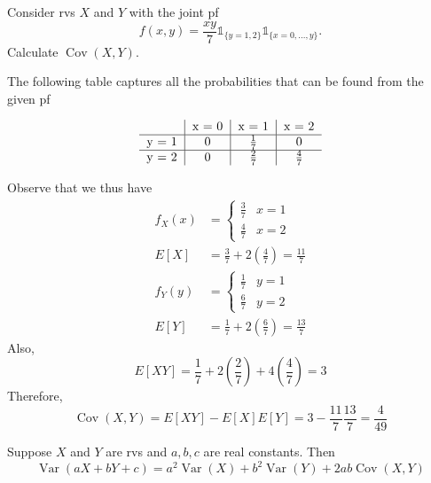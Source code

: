\documentclass[notoc,notitlepage]{tufte-book}
\DeclareMathOperator{\Var}{Var }
\DeclareMathOperator{\Cov}{Cov }
\begin{document}
\begin{eg}[Example 3.18]
  Consider rvs $X$ and $Y$ with the joint pf
  \begin{equation*}
    f(x, y) = \frac{xy}{7} \mathbb{1}_{\{y = 1, 2\}} \mathbb{1}_{\{x = 0, ..., y\}}.
  \end{equation*}
  Calculate $\Cov(X, Y)$.

  \begin{solution}
    The following table captures all the probabilities that can be found from the given pf

    \[
    \begin{tabular}{c | c | c | c}
            & x = 0 & x = 1       & x = 2 \\
      \hline
      y = 1 & 0     & $\frac{1}{7}$ & 0 \\
      \hline
      y = 2 & 0     & $\frac{2}{7}$ & $\frac{4}{7}$
    \end{tabular}
    \]

    Observe that we thus have
    \begin{align*}
      f_X(x) &= \begin{cases}
        \frac{3}{7} & x = 1 \\
        \frac{4}{7} & x = 2
      \end{cases} \\
      E[X] &= \frac{3}{7} + 2 \left( \frac{4}{7} \right) = \frac{11}{7} \\
      f_Y(y) &= \begin{cases}
        \frac{1}{7} & y = 1 \\
        \frac{6}{7} & y = 2
      \end{cases} \\
      E[Y] &= \frac{1}{7} + 2 \left( \frac{6}{7} \right) = \frac{13}{7}
    \end{align*}
    Also,
    \begin{equation*}
      E[XY] = \frac{1}{7} + 2 \left( \frac{2}{7} \right) + 4 \left( \frac{4}{7} \right) = 3
    \end{equation*}
    Therefore,
    \begin{equation*}
      \Cov(X, Y) = E[XY] - E[X]E[Y] = 3 - \frac{11}{7} \frac{13}{7} = \frac{4}{49}
    \end{equation*}
  \end{solution}
\end{eg}

\begin{thm}
\label{thm:variance_of_linear_combinations}
  Suppose $X$ and $Y$ are rvs and $a, b, c$ are real constants. Then
  \begin{equation*}
    \Var(aX + bY + c) = a^2 \Var(X) + b^2 \Var(Y) + 2ab \Cov (X, Y)
  \end{equation*}
\end{thm}
\end{document}

